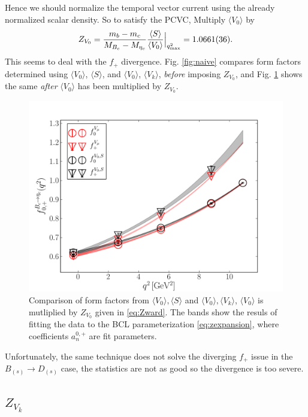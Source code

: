 Hence we should normalize the temporal vector current using the already normalized scalar density. So to satisfy the PCVC, Multiply $\langle V_0 \rangle$ by 
\begin{align}
	Z_{V_0} = {m_b-m_c \over M_{B_c}-M_{\eta_c} } { \langle S \rangle \over \langle V_0 \rangle }\Big\vert_{q^2_{\text{max}}} = 1.0661(36).
	\label{eq:Zward}
\end{align}
This seems to deal with the $f_+$ divergence. Fig. \ref{fig:naive} compares form factors determined using $\langle V_0 \rangle$, $\langle S \rangle$, and $\langle V_0 \rangle$, $\langle V_k \rangle$, {\textit{before}} imposing $Z_{V_0}$, and Fig. \ref{fig:Zward} shows the same {\textit{after}} $\langle V_0 \rangle$ has been multiplied by $Z_{V_0}$.
\begin{figure}[htb!]
\centering
\includegraphics[scale=0.55]{images/nrqcd/Bcetac_bothways_2.pdf}
\caption{Comparison of form factors from $\langle V_0 \rangle,\langle S \rangle $ and $\langle V_0\rangle,\langle V_k\rangle$, $\langle V_0\rangle$ is mutliplied by $Z_{V_0}$ given in \eqref{eq:Zward}. The bands show the resuls of fitting the data to the BCL parameterization \eqref{eq:zexpansion}, where coefficients $a^{0,+}_n$ are fit parameters. \label{fig:Zward}}
\end{figure}

Unfortunately, the same technique does not solve the diverging $f_+$ issue in the $B_{(s)}\to D_{(s)}$ case, the statistics are not as good so the divergence is too severe. 

\subsection{$Z_{V_k}$}
\label{sec:ZVk}

